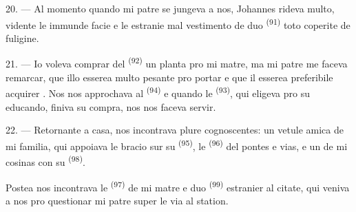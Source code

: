 \VUsaut{3.0mm}

20. --- Al momento quando mi patre se jungeva a nos, Johannes rideva multo,
vidente le immunde facie e le estranie mal vestimento de duo  \textsuperscript{(91)} toto coperite de fuligine.

21. --- Io voleva comprar del 
\textsuperscript{(92)} un planta pro mi matre, ma mi patre me faceva remarcar, que
illo esserea multo pesante pro portar e que il esserea preferibile acquirer
. Nos nos approchava al 
\textsuperscript{(94)} e quando le  \textsuperscript{(93)},
qui eligeva pro su educando, finiva su compra, nos nos faceva servir.

22. --- Retornante a casa, nos incontrava plure cognoscentes: un vetule amica de
mi familia, qui appoiava le bracio sur su 
\textsuperscript{(95)}, le  \textsuperscript{(96)} del pontes e
vias, e un de mi cosinas con su 
\textsuperscript{(98)}.

Postea nos incontrava le  \textsuperscript{(97)} de mi matre e duo
 \textsuperscript{(99)} estranier al citate, qui veniva a nos pro
questionar mi patre super le via al station.
\VUsaut{6.0mm}
\VUfilet{22mm}
